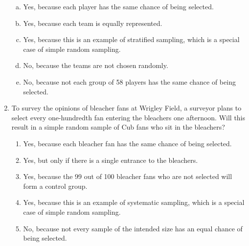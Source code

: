 \documentclass[a4paper,12pt,twoside]{book}
\begin{document}
\begin{enumerate}
   \begin{enumerate}[(a)]
       \item Yes, because each player has the same chance of being selected.
       \item Yes, because each team is equally represented.
       \item Yes, because this is an example of stratified sampling, which is a special case of simple random sampling.
       \item No, because the teams are not chosen randomly.
       \item No, because not each group of 58 players has the same chance of being selected.   
    \end{enumerate}    
    
  \item To survey the opinions of bleacher fans at Wrigley Field, a surveyor plans to select every one-hundredth fan entering the bleachers one afternoon. Will this result in a simple random sample of Cub fans who sit in the bleachers?
      \begin{enumerate}
          \item Yes, because each bleacher fan has the same chance of being selected.
          \item Yes, but only if there is a single entrance to the bleachers.
          \item  Yes, because the 99 out of 100 bleacher fans who are not selected will form a control group.
          \item  Yes, because this is an example of systematic sampling, which is a special case of simple random sampling.
          \item No, because not every sample of the intended size has an equal chance of being selected.
      \end{enumerate}
  

\end{enumerate}
\end{document}
